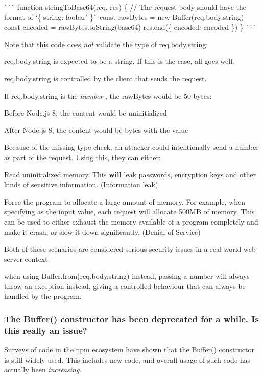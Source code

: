 \`{}\`{}\`{} function string\+To\+Base64(req, res) \{ // The request body should have the format of `\{ string\+: \textquotesingle{}foobar' \}\`{} const raw\+Bytes = new Buffer(req.\+body.\+string) const encoded = raw\+Bytes.\+to\+String(\textquotesingle{}base64\textquotesingle{}) res.\+end(\{ encoded\+: encoded \}) \} \`{}\`{}\`{}

Note that this code does {\itshape not} validate the type of {\ttfamily req.\+body.\+string}\+:


\begin{DoxyItemize}
\item {\ttfamily req.\+body.\+string} is expected to be a string. If this is the case, all goes well.
\item {\ttfamily req.\+body.\+string} is controlled by the client that sends the request.
\item If {\ttfamily req.\+body.\+string} is the {\itshape number} {}, the {\ttfamily raw\+Bytes} would be 50 bytes\+:
\begin{DoxyItemize}
\item Before Node.\+js 8, the content would be uninitialized
\item After Node.\+js 8, the content would be {} bytes with the value {}
\end{DoxyItemize}
\end{DoxyItemize}

Because of the missing type check, an attacker could intentionally send a number as part of the request. Using this, they can either\+:


\begin{DoxyItemize}
\item Read uninitialized memory. This {\bfseries will} leak passwords, encryption keys and other kinds of sensitive information. (Information leak)
\item Force the program to allocate a large amount of memory. For example, when specifying {} as the input value, each request will allocate 500\+MB of memory. This can be used to either exhaust the memory available of a program completely and make it crash, or slow it down significantly. (Denial of Service)
\end{DoxyItemize}

Both of these scenarios are considered serious security issues in a real-\/world web server context.

when using {\ttfamily Buffer.\+from(req.\+body.\+string)} instead, passing a number will always throw an exception instead, giving a controlled behaviour that can always be handled by the program.

\subsubsection*{The {\ttfamily Buffer()} constructor has been deprecated for a while. Is this really an issue?}

Surveys of code in the {\ttfamily npm} ecosystem have shown that the {\ttfamily Buffer()} constructor is still widely used. This includes new code, and overall usage of such code has actually been {\itshape increasing}. 